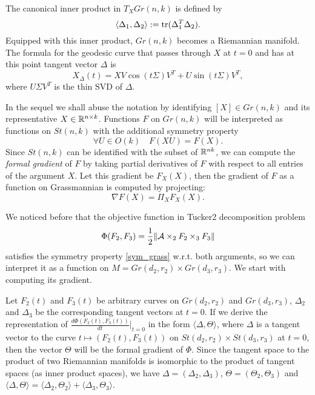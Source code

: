 The canonical inner product in $T_X Gr(n, k)$ is defined by
\begin{equation}
    \langle \Delta_1, \Delta_2 \rangle := \operatorname*{tr}( \Delta_1^T \Delta_2).
\end{equation}
Equipped with this inner product, $Gr(n, k)$ becomes a Riemannian
manifold. The formula
for the geodesic curve that passes through $X$ at $t = 0$ and has at this point tangent 
vector $\Delta$ is 
\begin{equation}
    X_{\Delta}(t) = XV \cos (t \Sigma) V^T + U \sin(t \Sigma) V^T,
\end{equation}
where $U \Sigma V^T$ is the thin SVD of $\Delta$.


In the sequel we shall abuse the notation by identifying $[X] \in Gr(n, k)$
and its representative $X \in \mathbb{R}^{n \times k}$. Functions $F$
on $Gr(n, k)$ will be interpreted as functions on $St(n, k)$ with the additional
symmetry property
\begin{equation}
    \label{sym_grass}
    \forall U \in O(k) \quad F(XU) = F(X).
\end{equation}
Since $St(n,k)$ can be identified with the subset of $\mathbb{R}^{nk}$, we can compute
the \textit{formal gradient} of $F$ by taking partial derivatives of $F$
with respect to all entries of the argument $X$. Let this gradient
be $F_X(X)$, then the gradient of $F$ as a function on Grassmannian
is computed by projecting:
\begin{equation}
\nabla F (X) = \Pi_{X} F_X(X).
\end{equation}

We noticed before that the objective function in Tucker2 decomposition 
problem
\begin{equation}
\Phi(F_2,F_3) = \frac{1}{2} \| \mathcal{A} \times _{2} F_2 \times _{3} F_3 \| 
\end{equation}
satisfies the symmetry property \eqref{sym_grass} w.r.t. both arguments,
so we can interpret it as a function on $M = Gr(d_2, r_2) \times Gr(d_3, r_3)$.
We start with computing its gradient. 


Let ${F_2}(t)$ and ${F_3}(t)$ be arbitrary curves on $Gr(d_2, r_2)$
and $Gr(d_3, r_3)$, $\Delta_2$ and $\Delta_3$ be the corresponding tangent
vectors at $t = 0$.
If we derive the representation of $\frac{d \Phi(F_2(t), F_3(t))}{dt} \rvert_{t = 0}$ in the form
$\langle \Delta, \Theta \rangle$, where $\Delta$ is a tangent vector
to the curve $t \mapsto (F_2(t), F_3(t))$ on $St(d_2, r_2) \times St(d_3, r_3)$ 
at $t = 0$, then the vector $\Theta$ will be the formal gradient of $\Phi$.
Since the tangent space to the product of two Riemannian manifolds is
isomorphic to the product of tangent spaces (as inner product spaces), we
have $\Delta = (\Delta_2, \Delta_3)$, $\Theta = (\Theta_2, \Theta_3)$
and $\langle \Delta, \Theta \rangle = \langle \Delta_2, \Theta_2 \rangle + 
\langle \Delta_3, \Theta_3 \rangle $.


